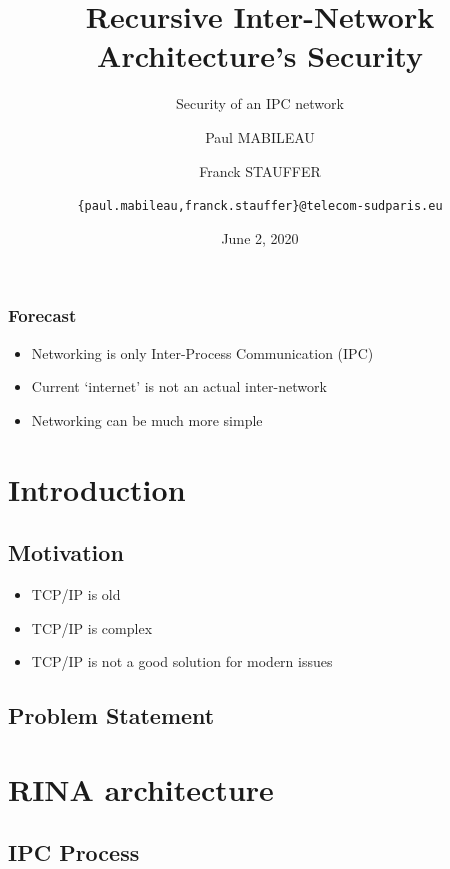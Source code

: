\documentclass[aspectratio=169]{beamer}
\author[MABILEAU, STAUFFER]{Paul MABILEAU
\and
Franck STAUFFER
\and 
\texttt{\{paul.mabileau,franck.stauffer\}@telecom-sudparis.eu}}
\institute[TSP]{TELECOM SudParis}
\title[RINA's security]{Recursive Inter-Network Architecture's Security}
\subtitle{Security of an IPC network}
\date[2020/06/02]{June 2, 2020}
\begin{document}
\maketitle

\begin{frame}
    \frametitle{Forecast}
    \begin{itemize}
        \item Networking is only Inter-Process Communication (IPC)
        \item Current `internet' is not an actual inter-network
        \item Networking can be much more simple
    \end{itemize}
\end{frame}


\section{Introduction}

\subsection{Motivation}
\begin{frame}
    \begin{itemize}
        \item TCP/IP is old
        \item TCP/IP is complex
        \item TCP/IP is not a good solution for modern issues
    \end{itemize}
\end{frame}

\subsection{Problem Statement}

\section{RINA architecture}
\subsection{IPC Process}
\end{document}
